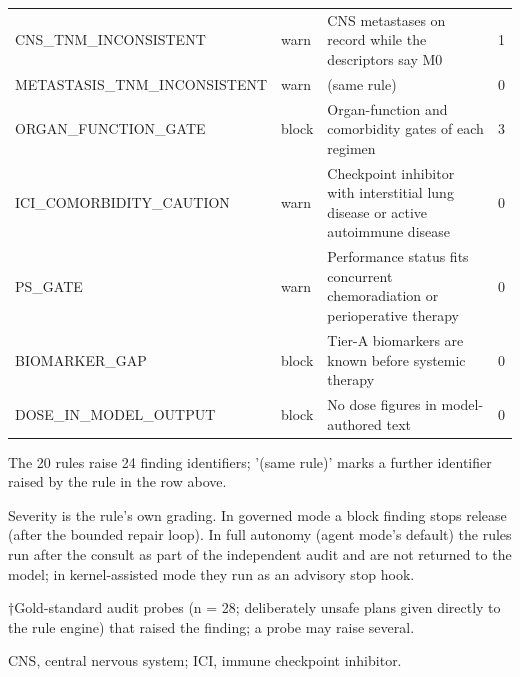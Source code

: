 \begin{table}[t]
\begin{tabular}{p{4.4cm}p{1.4cm}p{7.6cm}p{1.6cm}}
CNS\_TNM\_INCONSISTENT & warn & CNS metastases on record while the descriptors say M0 & 1 \\
METASTASIS\_TNM\_INCONSISTENT & warn & (same rule) & 0 \\
ORGAN\_FUNCTION\_GATE & block & Organ-function and comorbidity gates of each regimen & 3 \\
ICI\_COMORBIDITY\_CAUTION & warn & Checkpoint inhibitor with interstitial lung disease or active autoimmune disease & 0 \\
PS\_GATE & warn & Performance status fits concurrent chemoradiation or perioperative therapy & 0 \\
BIOMARKER\_GAP & block & Tier-A biomarkers are known before systemic therapy & 0 \\
DOSE\_IN\_MODEL\_OUTPUT & block & No dose figures in model-authored text & 0 \\
\bottomrule
\end{tabular}
\par\footnotesize The 20 rules raise 24 finding identifiers; '(same rule)' marks a further identifier raised by the rule in the row above.
\par\footnotesize *Severity is the rule's own grading. In governed mode a block finding stops release (after the bounded repair loop). In full autonomy (agent mode's default) the rules run after the consult as part of the independent audit and are not returned to the model; in kernel-assisted mode they run as an advisory stop hook.
\par\footnotesize †Gold-standard audit probes (n = 28; deliberately unsafe plans given directly to the rule engine) that raised the finding; a probe may raise several.
\par\footnotesize CNS, central nervous system; ICI, immune checkpoint inhibitor.
\end{table}
